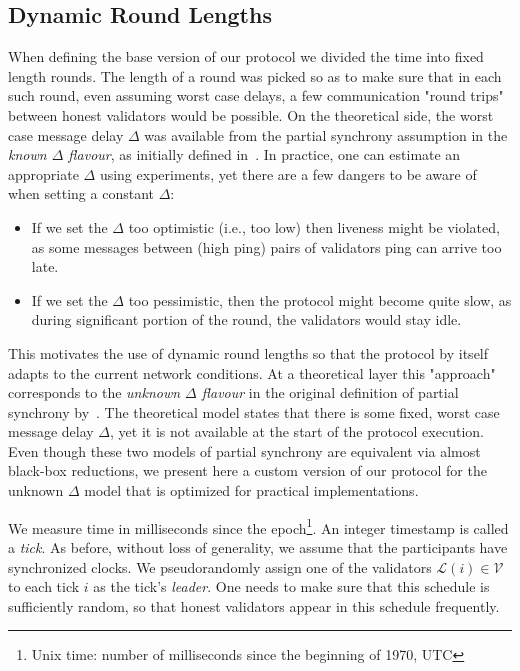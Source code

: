 \documentclass[12pt, fleqn]{article}
\begin{document}
\subsection{Dynamic Round Lengths}
When defining the base version of our protocol we divided the time into fixed length rounds.
%
The length of a round was picked so as to make sure that in each such round, even assuming worst case delays, a few communication "round trips" between honest validators would be possible.
%
On the theoretical side, the worst case message delay $\Delta$ was available from the partial synchrony assumption in the {\it known $\Delta$ flavour}, as initially defined in~\cite{DLS88}.
%
In practice, one can estimate an appropriate $\Delta$ using experiments, yet there are a few dangers to be aware of when setting a constant $\Delta$:
\begin{itemize}
    \item If we set the $\Delta$ too optimistic (i.e., too low) then liveness might be violated, as some messages between (high ping) pairs of validators ping can arrive too late.
    \item If we set the $\Delta$ too pessimistic, then the protocol might become quite slow, as during significant portion of the round, the validators would stay idle.
\end{itemize}

This motivates the use of dynamic round lengths so that the protocol by itself adapts to the current network conditions.
%
At a theoretical layer this "approach" corresponds to the {\it unknown $\Delta$ flavour} in the original definition of partial synchrony by~\cite{DLS88}.
%
The theoretical model states that there is some fixed, worst case message delay $\Delta$, yet it is not available at the start of the protocol execution.
%
Even though these two models of partial synchrony are equivalent via almost black-box reductions, we present here a custom version of our protocol for the unknown $\Delta$ model that is optimized for practical implementations.

We measure time in milliseconds since the epoch\footnote{Unix time: number of milliseconds since the beginning of 1970, UTC}.
%
An integer timestamp is called a \emph{tick}.
%
As before, without loss of generality, we assume that the participants have synchronized clocks.
%
We pseudorandomly assign one of the validators $\mathcal{L}(i) \in \mathcal{V}$ to each tick $i$ as the tick's \emph{leader}.
%
One needs to make sure that this schedule is sufficiently random, so that honest validators appear in this schedule frequently.
%
\end{document}
